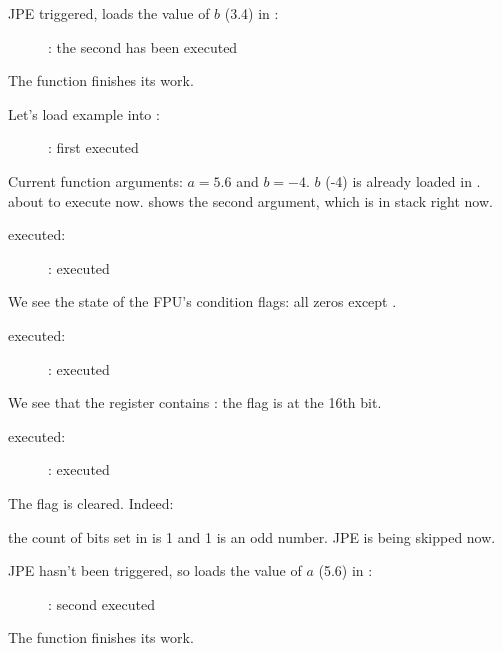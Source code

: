 \clearpage
\ac{JPE} triggered, \FLD loads the value of $b$ (3.4) in :

\begin{figure}[H]
\centering
{}
\caption{\olly: the second \FLD has been executed}
\label{fig:FPU_comparison_case1_olly5}
\end{figure}

The function finishes its work.

\clearpage
{}

Let's load example into \olly:

\begin{figure}[H]
\centering
{}
\caption{\olly: first \FLD executed}
\label{fig:FPU_comparison_case2_olly1}
\end{figure}

Current function arguments: $a=5.6$ and $b=-4$.
$b$ (-4) is already loaded in .
\FCOMP about to execute now. 
\olly shows the second \FCOMP argument, which is in stack right now.

\clearpage
\FCOMP executed:

\begin{figure}[H]
\centering
{}
\caption{\olly: \FCOMP executed}
\label{fig:FPU_comparison_case2_olly2}
\end{figure}

We see the state of the \ac{FPU}'s condition flags: all zeros except \Czero.

\clearpage
\FNSTSW executed:

\begin{figure}[H]
\centering
{}
\caption{\olly: \FNSTSW executed}
\label{fig:FPU_comparison_case2_olly3}
\end{figure}

We see that the  register contains : the \Czero flag is at the 16th bit.

\clearpage
\TEST executed:

\begin{figure}[H]
\centering
{}
\caption{\olly: \TEST executed}
\label{fig:FPU_comparison_case2_olly4}
\end{figure}

The   flag is cleared.
Indeed: 

the count of bits set in  is 1 and 1 is an odd number.
\ac{JPE} is being skipped now.

\clearpage
\ac{JPE} hasn't been triggered, so \FLD loads the value of $a$ (5.6) in :

\begin{figure}[H]
\centering
{}
\caption{\olly: second \FLD executed}
\label{fig:FPU_comparison_case2_olly5}
\end{figure}

The function finishes its work.
